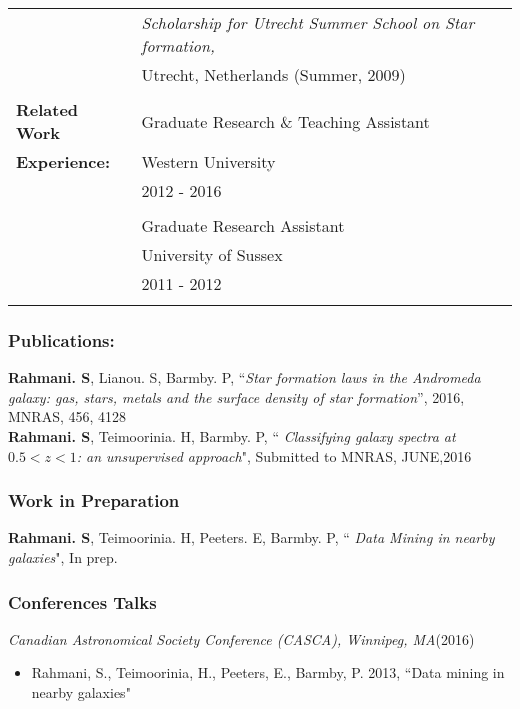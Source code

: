 \documentclass[12pt,twoside]{report}
\numberwithin{figure}{chapter}
\begin{document}
\begin{table}[ht]
\begin{tabular}{ll}
&{\sl Scholarship for Utrecht Summer School on Star formation,}\\
&Utrecht, Netherlands (Summer, 2009)\\\\
\textbf{Related Work}& Graduate Research \& Teaching Assistant\\
\textbf{Experience:}& Western University\\
& 2012 - 2016\\\\
&Graduate Research Assistant\\
& University of Sussex \\
& 2011 - 2012\\\\
\end{tabular}
\end{table}

\subsubsection*{Publications:}
 \textbf{Rahmani. S}, Lianou. S, Barmby. P, ``{\em Star formation laws in the Andromeda galaxy: gas, stars, metals and the surface density of star formation}'', 2016, MNRAS, 456, 4128\\
\textbf{Rahmani. S}, Teimoorinia. H, Barmby. P, `` {\em Classifying galaxy spectra at $0.5<z<1$: an unsupervised approach}", Submitted to MNRAS, JUNE,2016\\

\subsubsection*{Work in Preparation}
 \textbf{Rahmani. S}, Teimoorinia. H, Peeters. E, Barmby. P, `` {\em Data Mining in nearby galaxies}", In prep.\\

\subsubsection*{Conferences Talks}

{\sl Canadian Astronomical Society Conference (CASCA), Winnipeg, MA}\hfill(2016)
\begin{itemize} 
\item Rahmani, S., Teimoorinia, H., Peeters, E.,  Barmby, P. 2013, ``Data mining in nearby galaxies" 
\end{itemize}
\end{document}

